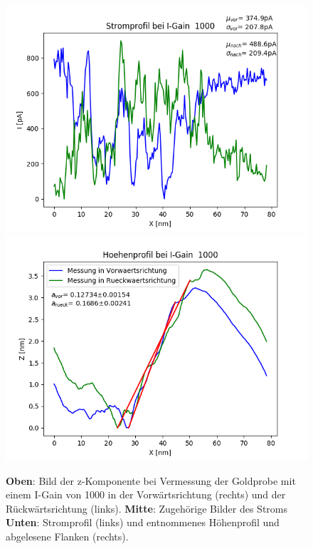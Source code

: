 \documentclass[12pt,a4paper]{article}
\begin{document}
\begin{figure}[H]
\includegraphics[scale=0.5]{Bilder/Anhang/IGain/Strom/Strom_Profil_IGain_1000.png}
\includegraphics[scale=0.5]{Bilder/Anhang/IGain/Profil_IGain_1000.png}
\caption{\textbf{Oben}: Bild der z-Komponente bei Vermessung der Goldprobe mit einem I-Gain von 1000 in der Vorwärtsrichtung (rechts) und der Rückwärtsrichtung (links). \textbf{Mitte}: Zugehörige Bilder des Stroms \textbf{Unten}: Stromprofil (links) und entnommenes Höhenprofil und abgelesene Flanken (rechts).}
\end{figure}
\end{document}
